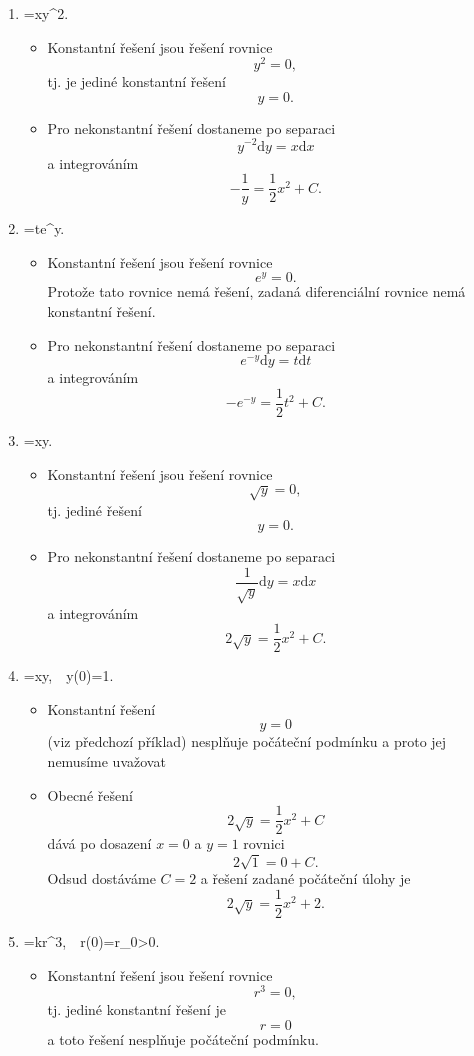 \begin{enumerate}[(1)]
\item \priklad {}=x\cdot y^2.
  \begin{itemize}
  \item Konstantní řešení jsou řešení rovnice $$ y^2=0,$$ tj. je jediné konstantní řešení $$ y=0.$$
  \item Pro nekonstantní řešení dostaneme po separaci  $$ y^{-2}\mathrm dy=x\mathrm dx $$ a integrováním $$ -\frac 1y=\frac 12 x^2+C.$$
  \end{itemize}
\item \priklad {}=t\cdot e^y.
  \begin{itemize}
  \item Konstantní řešení jsou řešení rovnice $$ e^y=0.$$ Protože tato rovnice nemá řešení, zadaná diferenciální rovnice nemá konstantní řešení.
  \item Pro nekonstantní řešení dostaneme po separaci  $$ e^{-y}\mathrm dy= t\mathrm dt$$ a integrováním $$ -e^{-y}=\frac 12 t^2 +C.$$
  \end{itemize}
\item \priklad {}=x\cdot \sqrt y.
  \begin{itemize}
  \item Konstantní řešení jsou řešení rovnice $$ \sqrt y=0,$$ tj. jediné řešení $$ y=0.$$
  \item Pro nekonstantní řešení dostaneme po separaci  $$ \frac 1{\sqrt y}\mathrm dy=x\mathrm dx $$ a integrováním $$ 2\sqrt y=\frac 12 x^2+C.$$
  \end{itemize}
\item \priklad {}=x\sqrt y,\ \ y(0)=1.
  \begin{itemize}
  \item Konstantní řešení $$y=0$$ (viz předchozí příklad) nesplňuje počáteční podmínku a proto jej nemusíme uvažovat
  \item Obecné řešení  $$ 2\sqrt y=\frac 12x^2 +C$$ dává po dosazení $x=0$ a $y=1$ rovnici $$2\sqrt 1=0+C.$$ Odsud dostáváme $C=2$ a řešení zadané počáteční úlohy je $$2\sqrt y=\frac 12 x^2+2.$$
  \end{itemize}
\item \priklad {}=k\cdot r^3,\ \ r(0)=r_0>0.
  \begin{itemize}
  \item Konstantní řešení jsou řešení rovnice $$ r^3=0,$$ tj. jediné konstantní řešení je $$ r=0$$ a toto řešení nesplňuje počáteční podmínku.

\end{itemize}
\end{enumerate}
